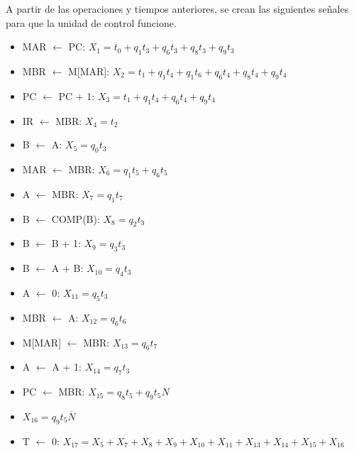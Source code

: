 \documentclass{article}
\begin{document}
A partir de las operaciones y tiempos anteriores, se crean las siguientes señales para que la unidad de control funcione.

\begin{itemize}

  \item MAR $\leftarrow$ PC: $X_1 = t_0 + q_1 t_3 + q_6 t_3 + q_8 t_3 + q_9 t_3$

  \item MBR $\leftarrow$ M[MAR]: $X_2 = t_1 + q_1 t_4 + q_1 t_6 + q_6 t_4 + q_8 t_4 + q_9 t_4$

  \item PC $\leftarrow$ PC + 1: $X_3 = t_1 + q_1 t_4 + q_6 t_4 + q_9 t_4$

  \item IR $\leftarrow$ MBR: $X_4 = t_2 $

  \item B $\leftarrow$ A: $X_5 = q_0 t_3$

  \item MAR $\leftarrow$ MBR: $X_6 = q_1 t_5 + q_6 t_5$

  \item A $\leftarrow$ MBR: $X_7 = q_1 t_7$

  \item B $\leftarrow$ COMP(B): $X_8 = q_2 t_3$

  \item B $\leftarrow$ B + 1: $X_9 = q_3 t_3$

  \item B $\leftarrow$ A + B: $X_{10} = q_4 t_3$

  \item A $\leftarrow$ 0: $X_{11} = q_5 t_3$

  \item MBR $\leftarrow$ A: $X_{12} = q_6 t_6$

  \item M[MAR] $\leftarrow$ MBR: $X_{13} = q_6 t_7$

  \item A $\leftarrow$ A + 1: $X_{14} = q_7 t_3$

  \item PC $\leftarrow$ MBR: $X_{15} = q_8 t_5 + q_9 t_5 N$

  \item $X_{16} = q_9 t_5 \overline{N}$

  \item T $\leftarrow$ 0: $X_{17} = X_5 + X_7 + X_8 + X_9 + X_{10} + X_{11} + X_{13} + X_{14} + X_{15} + X_{16}$

\end{itemize}
\end{document}
